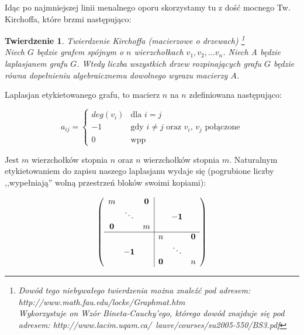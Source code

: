 \documentclass[a4paper,11pt]{article}
\newtheorem{lemma}{Twierdzenie} %
\begin{document}
Idąc po najmniejszej linii menalnego oporu skorzystamy tu z dość mocnego Tw. Kirchoffa, które brzmi następująco:

\begin{lemma} Twierdzenie Kirchoffa (macierzowe o drzewach) \footnote{Dowód tego niebywałego twierdzenia można znaleźć pod adresem: http://www.math.fau.edu/locke/Graphmat.htm \\ Wykorzystuje on Wzór Bineta-Cauchy'ego, którego dowód znajduje się pod adresem: http://www.lacim.uqam.ca/~lauve/courses/su2005-550/BS3.pdf} \\
Niech $G$ będzie grafem spójnym o $n$ wierzchołkach $v_1, v_2, ... v_n$. Niech A będzie laplasjanem grafu $G$. Wtedy liczba wszystkich drzew rozpinających grafu $G$ będzie równa dopełnieniu algebraicznemu dowolnego wyrazu macierzy $A$.
\end{lemma}

Laplasjan etykietowanego grafu, to macierz $n$ na $n$ zdefiniowana następująco:

\begin{displaymath}
a_{ij} = \left\{ \begin{array}{ll}
deg(v_i) & \textrm{dla $i=j$}\\
-1 & \textrm{gdy $i\not=j$ oraz $v_i$, $v_j$ połączone}\\
0 & \textrm{wpp}
\end{array} \right.
\end{displaymath}

Jest $m$ wierzchołków stopnia $n$ oraz $n$ wierzchołków stopnia $m$. Naturalnym etykietowaniem do zapisu naszego laplasjanu wydaje się (pogrubione liczby ,,wypełniają'' wolną przestrzeń bloków swoimi kopiami):

\begin{displaymath}
\left(
\begin{array}{ccc|ccc}
m          &             & \mathbf{0} &            &             &            \\
           & \ddots      &            &            & \mathbf{-1} &            \\
\mathbf{0} &             & m          &            &             &            \\ \hline
           &             &            & n          &             & \mathbf{0} \\
           & \mathbf{-1} &            &            & \ddots      &            \\
           &             &            & \mathbf{0} &             & n          

\end{array} \right)
\end{displaymath}
\end{document}
